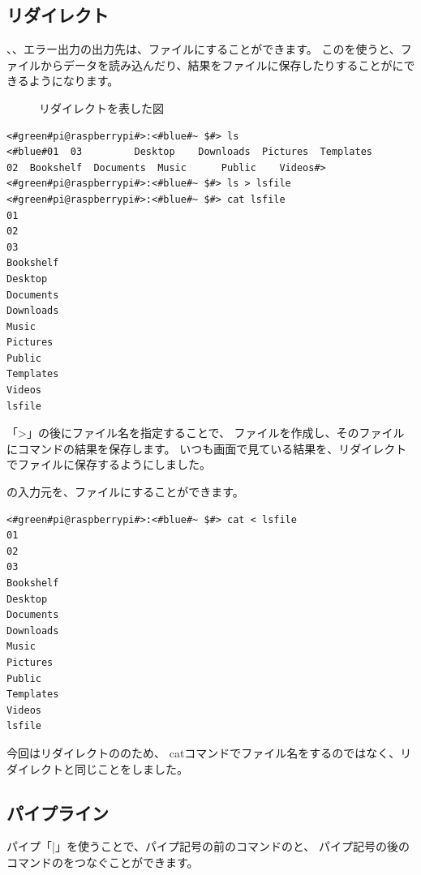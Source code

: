 \subsection{リダイレクト}
、、エラー出力の出力先は、ファイルにすることができます。
このを使うと、ファイルからデータを読み込んだり、結果をファイルに保存したりすることがにできるようになります。

\begin{figure}
    \centering
    
    \caption{リダイレクトを表した図}
    \label{ch03:redirect}
\end{figure}


\begin{lstlisting}[caption=lsの出力をリダイレクトする, label=redirectLs]
<#green#pi@raspberrypi#>:<#blue#~ $#> ls 
<#blue#01  03         Desktop    Downloads  Pictures  Templates
02  Bookshelf  Documents  Music      Public    Videos#>
<#green#pi@raspberrypi#>:<#blue#~ $#> ls > lsfile
<#green#pi@raspberrypi#>:<#blue#~ $#> cat lsfile
01
02
03
Bookshelf
Desktop
Documents
Downloads
Music
Pictures
Public
Templates
Videos
lsfile
\end{lstlisting}

「>」の後にファイル名を指定することで、
ファイルを作成し、そのファイルにコマンドの結果を保存します。
いつも画面で見ている結果を、リダイレクトでファイルに保存するようにしました。


の入力元を、ファイルにすることができます。
\begin{lstlisting}[caption=catコマンドにリダイレクトでファイルを入力する, label=redirectCat]
<#green#pi@raspberrypi#>:<#blue#~ $#> cat < lsfile
01
02
03
Bookshelf
Desktop
Documents
Downloads
Music
Pictures
Public
Templates
Videos
lsfile
\end{lstlisting}

今回はリダイレクトののため、
catコマンドでファイル名をするのではなく、リダイレクトと同じことをしました。

\subsection{パイプライン}

パイプ「|」を使うことで、パイプ記号の前のコマンドのと、
パイプ記号の後のコマンドのをつなぐことができます。

